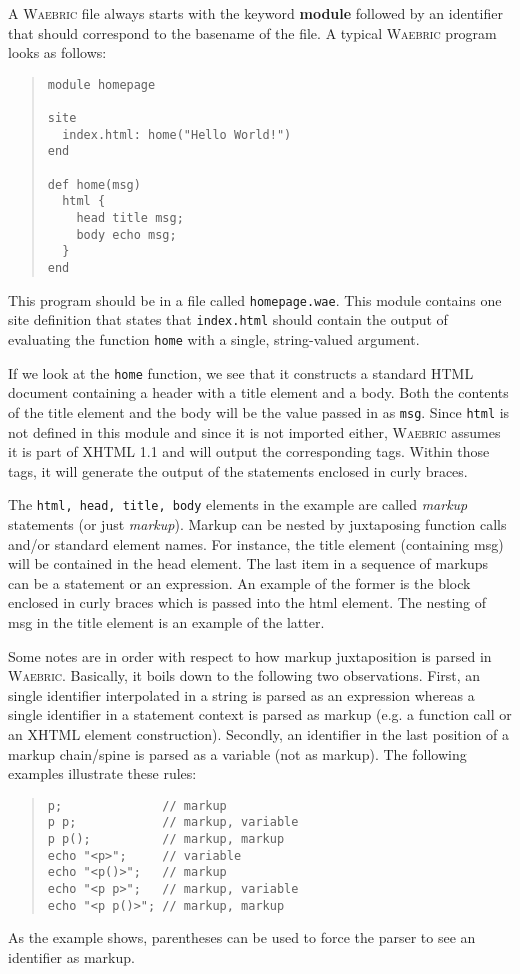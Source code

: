 \documentclass[a4paper]{article}
\def\waebric{\textsc{Waebric}\xspace}
\begin{document}
A \waebric file always starts with the keyword \textbf{module}
followed by an identifier that should correspond to the basename of
the file. A typical  \waebric program looks as follows:
\begin{quote}
\begin{lstlisting}[language=waebric]
module homepage

site 
  index.html: home("Hello World!")
end

def home(msg)
  html {
    head title msg;
    body echo msg;
  }
end
\end{lstlisting}
\end{quote}
This program should be in a file called \texttt{homepage.wae}. This
module contains one site definition that states that
\texttt{index.html} should contain the output of evaluating the
function \texttt{home} with a single, string-valued argument.

If we look at the \texttt{home} function, we see that it constructs a
standard HTML document containing a header with a title element and a
body. Both the contents of the title element and the body will be the
value passed in as \texttt{msg}. Since \texttt{html} is not defined in
this module and since it is not imported either, \waebric assumes it
is part of XHTML 1.1 and will output the corresponding tags. Within
those tags, it will generate the output of the statements enclosed in
curly braces. 

The \texttt{html, head, title, body} elements in the example are
called \textit{markup} statements (or just \textit{markup}). Markup
can be nested by juxtaposing function calls and/or standard element
names. For instance, the title element (containing msg) will be
contained in the head element. The last item in a sequence of markups
can be a statement or an expression. An example of the former is the
block enclosed in curly braces which is passed into the html
element. The nesting of msg in the title element is an example of the
latter.


Some notes are in order with respect to how markup juxtaposition is
parsed in \waebric. Basically, it boils down to the following two
observations. First, an single identifier interpolated in a string is
parsed as an expression whereas a single identifier in a statement
context is parsed as markup (e.g. a function call or an XHTML element
construction). Secondly, an identifier in the last position of a
markup chain/spine is parsed as a variable (not as markup). The
following examples illustrate these rules:
\begin{quote}
\begin{lstlisting}[language=waebric]
p;              // markup
p p;            // markup, variable
p p();          // markup, markup
echo "<p>";     // variable
echo "<p()>";   // markup
echo "<p p>";   // markup, variable
echo "<p p()>"; // markup, markup
\end{lstlisting}
\end{quote}
As the example shows, parentheses can be used to force the parser to
see an identifier as markup.
\end{document}
